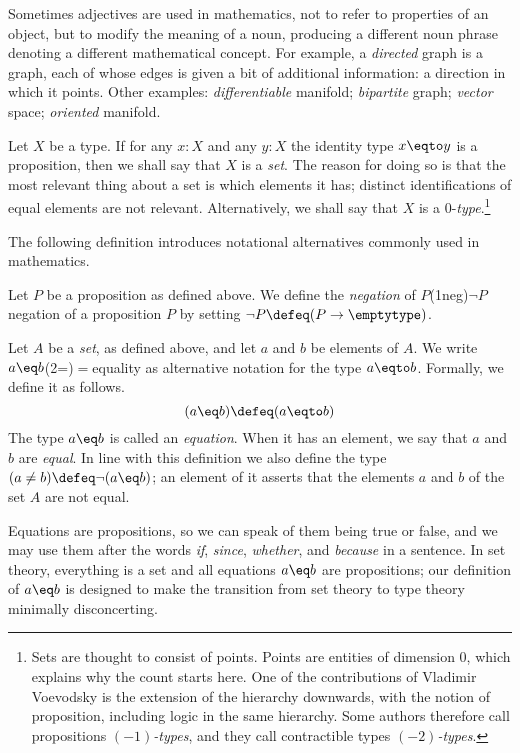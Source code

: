 Sometimes adjectives are used in mathematics, not to refer to properties of an object, but to modify the meaning of a noun, producing a
different noun phrase denoting a different mathematical concept.  For example, a \emph{directed} graph is a graph, each of whose edges is given
a bit of additional information: a direction in which it points.  Other examples: \emph{differentiable} manifold; \emph{bipartite} graph;
\emph{vector} space; \emph{oriented} manifold.

Let $X$ be a type.  If for any $x:X$ and any $y:X$ the identity
type $x \eqto y$ is a proposition, then we shall say that $X$ is a \emph{set}.%
The reason for doing so is that the most relevant
thing about a set is which elements it has; distinct identifications
of equal elements are not relevant.
Alternatively, we shall say that $X$ is a $0$-\emph{type}.\footnote{%
Sets are thought to consist of points. Points are entities of dimension 0,
which explains why the count starts here.
One of the contributions of Vladimir Voevodsky is the extension of
the hierarchy downwards, with the notion of proposition,
including logic in the same hierarchy.
Some authors therefore call propositions \emph{$(-1)$-types},
and they call contractible types \emph{$(-2)$-types}.}

The following definition introduces notational alternatives
commonly used in mathematics.

\begin{definition}\label{def:neg-eq-ne}
  Let $P$ be a proposition as defined above.
  We define the \emph{negation} of $P$\glossary(1neg){$\neg P$}{negation of a proposition $P$}
  by setting $\neg P \defeq (P \to \emptytype)$.

  Let $A$ be a \emph{set}, as defined above,
  and let $a$ and $b$ be elements of $A$.
  We write $a \eq b$\glossary(2=){$=$}{equality} as alternative
  notation for the type $a \eqto b$.  Formally, we define it as follows.
  \[
  (a \eq b) \defeq (a \eqto b)
  \]
  The type $a \eq b$ is called an \emph{equation}.
  When it has an element, we say that $a$ and $b$ are \emph{equal}.
  In line with this definition we also define the type
  $(a \ne b) \defeq \neg (a \eq b)$; an element of it asserts
  that the elements $a$ and $b$ of the set $A$ are not equal.
\end{definition}

Equations are propositions, so we can speak of them being true or false, and we may use them after the words \emph{if}, \emph{since},
\emph{whether}, and
\emph{because} in a sentence.  In set theory, everything is a set and all equations $a \eq b$ are propositions; our definition of $a \eq b$ is
designed to make the transition from set theory to type theory minimally disconcerting.

